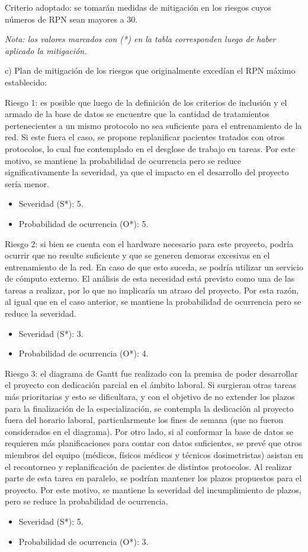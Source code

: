 \documentclass[
11pt, %
codirector, %
]{charter}
\begin{document}
Criterio adoptado: se tomarán medidas de mitigación en los riesgos cuyos números de RPN sean mayores a 30.

\textit{Nota: los valores marcados con (*) en la tabla corresponden luego de haber aplicado la mitigación.}

c) Plan de mitigación de los riesgos que originalmente excedían el RPN máximo establecido:
 
Riesgo 1: es posible que luego de la definición de los criterios de inclusión y el armado de la base de datos se encuentre que la cantidad de tratamientos pertenecientes a un mismo protocolo no sea suficiente para el entrenamiento de la red. Si este fuera el caso, se propone replanificar pacientes tratados con otros protocolos, lo cual fue contemplado en el desglose de trabajo en tareas. Por este motivo, se mantiene la probabilidad de ocurrencia pero se reduce significativamente la severidad, ya que el impacto en el desarrollo del proyecto sería menor.
  \begin{itemize}
	\item Severidad (S*): 5.
	\item Probabilidad de ocurrencia (O*): 5.
	\end{itemize}

Riesgo 2: si bien se cuenta con el hardware necesario para este proyecto, podría ocurrir que no resulte suficiente y que se generen demoras excesivas en el entrenamiento de la red. En caso de que esto suceda, se podría utilizar un servicio de cómputo externo. El análisis de esta necesidad está previsto como una de las tareas a realizar, por lo que no implicaría un atraso del proyecto. Por esta razón, al igual que en el caso anterior, se mantiene la probabilidad de ocurrencia pero se reduce la severidad.
  \begin{itemize}
	\item Severidad (S*): 3.
	\item Probabilidad de ocurrencia (O*): 4.
	\end{itemize}
 
Riesgo 3: el diagrama de Gantt fue realizado con la premisa de poder desarrollar el proyecto con dedicación parcial en el ámbito laboral. Si surgieran otras tareas más prioritarias y esto se dificultara, y con el objetivo de no extender los plazos para la finalización de la especialización, se contempla la dedicación al proyecto fuera del horario laboral, particularmente los fines de semana (que no fueron considerados en el diagrama). Por otro lado, si al conformar la base de datos se requieren más planificaciones para contar con datos suficientes, se prevé que otros miembros del equipo (médicos, físicos médicos y técnicos dosimetristas) asistan en el recontorneo y replanificación de pacientes de distintos protocolos. Al realizar parte de esta tarea en paralelo, se podrían mantener los plazos propuestos para el proyecto. Por este motivo, se mantiene la severidad del incumplimiento de plazos, pero se reduce la probabilidad de ocurrencia.
  \begin{itemize}
	\item Severidad (S*): 5.
	\item Probabilidad de ocurrencia (O*): 3.
	\end{itemize}
\end{document}
